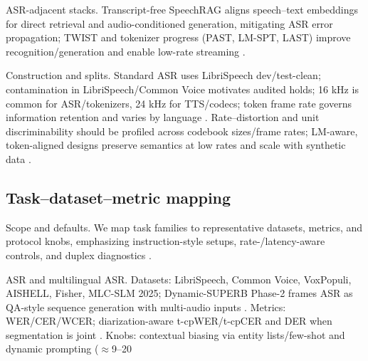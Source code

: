 \documentclass{article}
\begin{document}
ASR-adjacent stacks. Transcript-free SpeechRAG aligns speech--text embeddings for direct retrieval and audio-conditioned generation, mitigating ASR error propagation; TWIST and tokenizer progress (PAST, LM-SPT, LAST) improve recognition/generation and enable low-rate streaming \cite{min2025speechretrievalaugmentedgenerationwithou,hassid2024textuallypretrainedspeechlanguagemodels,har-tuv2025pastphoneticacousticspeechtokenizer,jo2025lmsptalignedsemanticdistillationspeechto,turetzky2024lastlanguagemodelawarespeechtokenization}.

Construction and splits. Standard ASR uses LibriSpeech dev/test-clean; contamination in LibriSpeech/Common Voice motivates audited holds; 16 kHz is common for ASR/tokenizers, 24 kHz for TTS/codecs; token frame rate governs information retention and varies by language \cite{tseng2025evaluationllmsspeechisoftenflawedtestset,zhang2025impactframeratesspeechtokenizercasestudy,li2024investigatingneuralaudiocodecsspeechlang,ye2024codecdoesmatterexploringsemanticshortcom,li2024effectivenessacousticbpedecoderonlytts}. Rate--distortion and unit discriminability should be profiled across codebook sizes/frame rates; LM-aware, token-aligned designs preserve semantics at low rates and scale with synthetic data \cite{turetzky2024lastlanguagemodelawarespeechtokenization,maimon2025scalinganalysisinterleavedspeechtextlang,zeng2024scalingspeechtextpretrainingsyntheticint,hassid2024textuallypretrainedspeechlanguagemodels,guo2025fastlongspeechenhancinglargespeechlangua}.

\subsection{Task--dataset--metric mapping} \label{subsec:task--dataset--metricmapping}

Scope and defaults. We map task families to representative datasets, metrics, and protocol knobs, emphasizing instruction-style setups, rate-/latency-aware controls, and duplex diagnostics \cite{vashishth2024stabspeechtokenizerassessmentbenchmark,entry2025indicsuperbspeechprocessinguniversalperf}.

ASR and multilingual ASR. Datasets: LibriSpeech, Common Voice, VoxPopuli, AISHELL, Fisher, MLC-SLM 2025; Dynamic-SUPERB Phase-2 frames ASR as QA-style sequence generation with multi-audio inputs \cite{huang2025dynamicsuperbphase2collaborativelyexpand,li2025seewossubmissionmlcslmlessonslearnedspee}. Metrics: WER/CER/WCER; diarization-aware t-cpWER/t-cpCER and DER when segmentation is joint \cite{kando2025exploringeffectsegmentationvocabularysiz}. Knobs: contextual biasing via entity lists/few-shot and dynamic prompting ($\approx$9--20%
\end{document}
